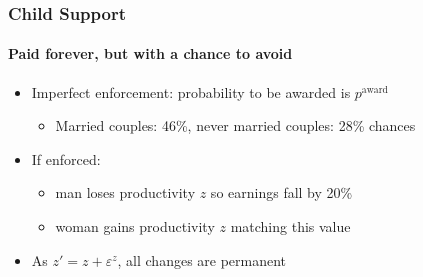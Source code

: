 \documentclass[aspectratio=169]{beamer}
\let\olditem\item
\renewcommand{\item}{%
\olditem\vspace{\fill}}
\begin{document}
\begin{frame}
\frametitle{Child Support}
\framesubtitle{Paid forever, but with a chance to avoid}
\begin{itemize}
\item Imperfect enforcement: probability to be awarded is $p^{\text{award}}$
\begin{itemize}
\item Married couples: 46\%, never married couples: 28\% chances
\end{itemize}
\item If enforced:
\begin{itemize}
\item man loses productivity $z$ so earnings fall by 20\%
\item woman gains productivity $z$ matching this value
\end{itemize}
\item As $z' = z + \varepsilon^z$, all changes are permanent
\end{itemize}
\end{frame}

\end{document}
